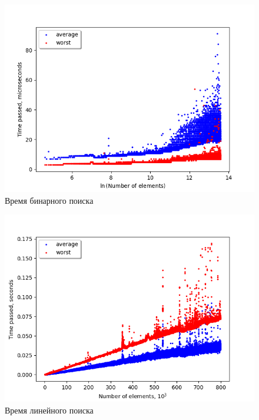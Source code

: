 \documentclass{article}
\begin{document}
\begin{figure}
\includegraphics{bin.png}
\caption{Время бинарного поиска}
\end{figure}

\begin{figure}
\includegraphics{lin.png}
\caption{Время линейного поиска}
\end{figure}
\end{document}
